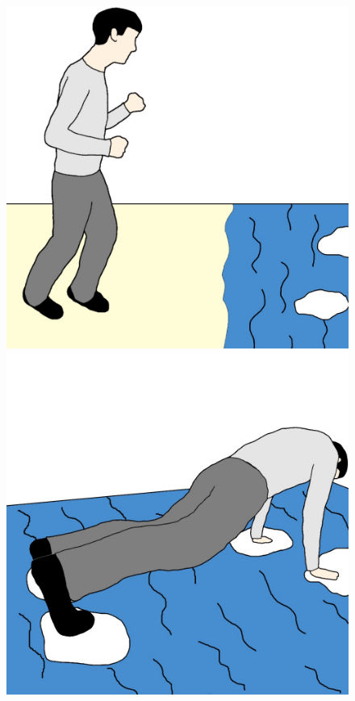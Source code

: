 \documentclass[twocolumn,showpacs,%
  nofootinbib,aps,superscriptaddress,%
  eqsecnum,prd,notitlepage,showkeys,10pt]{revtex4-1}
\begin{document}
\begin{figure}[!htb]
  \includegraphics[width=\linewidth]{graphics/Image(7).jpg}
\endminipage\hfill
{}
  \includegraphics[width=\linewidth]{graphics/Image(8).jpg}

\end{figure}
\end{document}
